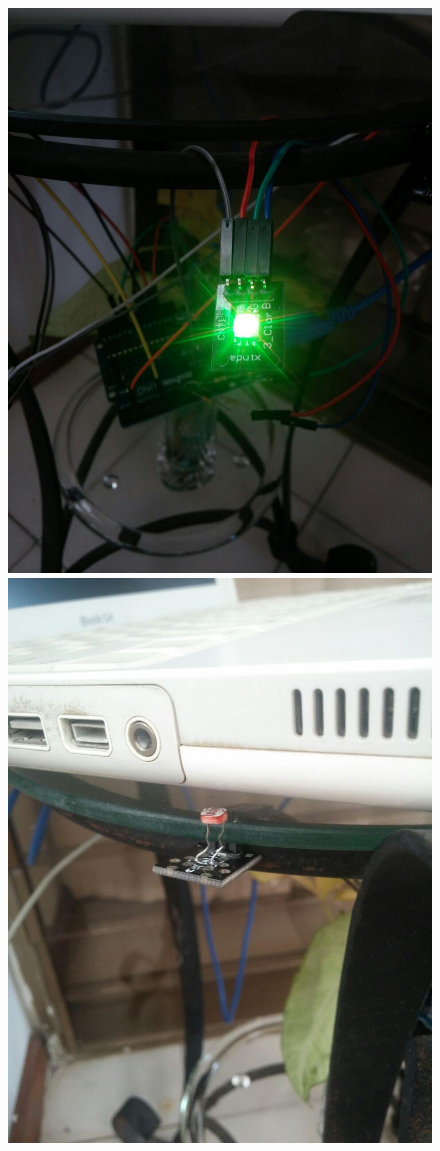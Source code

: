 \begin{itemize}
\begin{figure}[htb]
\includegraphics[scale=0.11]{./Figuras/rgb_ext.jpg}
\includegraphics[scale=0.11]{./Figuras/fotorresistencia.jpg}

\end{figure}
\end{itemize}
